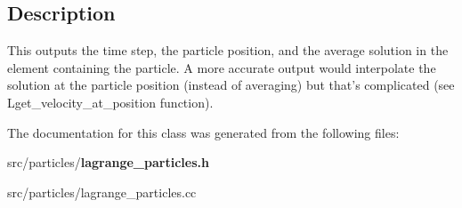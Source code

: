\subsection{Description}\label{scalar__def_8h_Description}
This outputs the time step, the particle position, and the average solution in the element containing the particle. A more accurate output would interpolate the solution at the particle position (instead of averaging) but that's complicated (see Lget\-\_\-velocity\-\_\-at\-\_\-position function).

The documentation for this class was generated from the following files\-:\begin{DoxyCompactItemize}
\item 
src/particles/{\bf lagrange\-\_\-particles.\-h}\item 
src/particles/lagrange\-\_\-particles.\-cc\end{DoxyCompactItemize}
